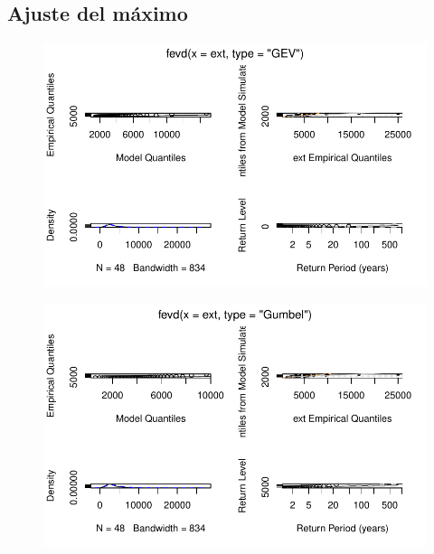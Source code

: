 \documentclass[
  letterpaper,
  onepage,
  openany]{scrreprt}
\begin{document}
\hypertarget{ajuste-del-muxe1ximo}{%
\subsection{Ajuste del máximo}\label{ajuste-del-muxe1ximo}}

\begin{figure}[H]

{\centering \includegraphics{./Bit4_files/figure-pdf/unnamed-chunk-11-1.pdf}

}

\end{figure}

\begin{figure}[H]

{\centering \includegraphics{./Bit4_files/figure-pdf/unnamed-chunk-12-1.pdf}

}

\end{figure}
\end{document}
